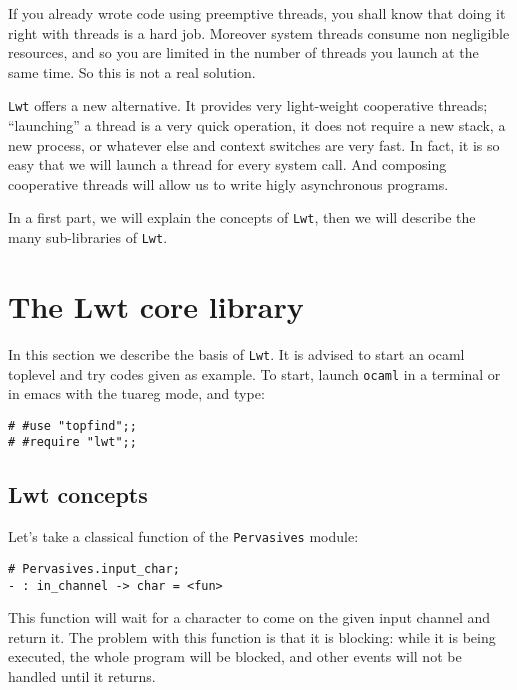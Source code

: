 \documentclass{article}
\newcommand{\lwt}{\texttt{Lwt}\xspace}
\begin{document}
If you already wrote code using preemptive threads, you shall know
that doing it right with threads is a hard job. Moreover system
threads consume non negligible resources, and so you are limited in
the number of threads you launch at the same time. So this is not a
real solution.

\lwt offers a new alternative. It provides very light-weight
cooperative threads; ``launching'' a thread is a very quick operation,
it does not require a new stack, a new process, or whatever else and
context switches are very fast. In fact, it is so easy that we will
launch a thread for every system call. And composing cooperative
threads will allow us to write higly asynchronous programs.

In a first part, we will explain the concepts of \lwt, then we will
describe the many sub-libraries of \lwt.

\section{The Lwt core library}

In this section we describe the basis of \lwt. It is advised to start
an ocaml toplevel and try codes given as example. To start, launch
\texttt{ocaml} in a terminal or in emacs with the tuareg mode, and
type:

\begin{verbatim}
# #use "topfind";;
# #require "lwt";;
\end{verbatim}

\subsection{Lwt concepts}

Let's take a classical function of the \texttt{Pervasives} module:

\begin{verbatim}
# Pervasives.input_char;
- : in_channel -> char = <fun>
\end{verbatim}

This function will wait for a character to come on the given input
channel and return it. The problem with this function is that it is
blocking: while it is being executed, the whole program will be
blocked, and other events will not be handled until it returns.
\end{document}
